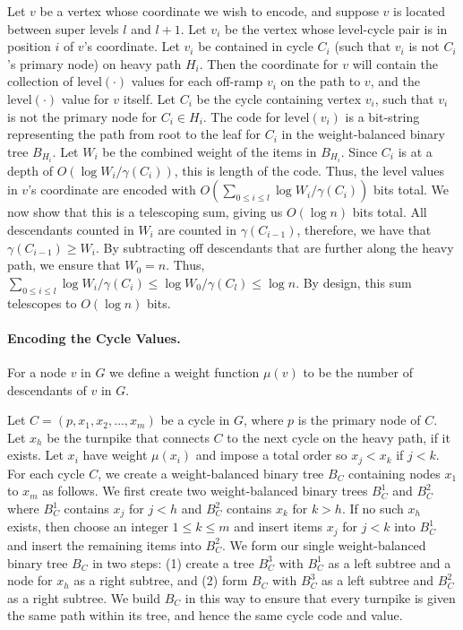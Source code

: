 \documentclass[11pt]{article}
\newcommand{\cycle}{\mathrm{cycle}}
\newcommand{\level}{\mathrm{level}}
\renewcommand{\subsection}[1]{\paragraph{#1.}}
\begin{document}
Let $v$ be a vertex whose coordinate we wish to encode, and suppose $v$ is located
between super levels $l$ and $l+1$. Let $v_i$ be the vertex whose $\level$-$\cycle$
pair is in position $i$ of $v$'s coordinate. Let $v_i$ be contained in cycle $C_i$ 
(such that $v_i$ is not $C_i$'s primary node) on heavy path $H_i$. 
\ifFull
Then the coordinate for $v$ will contain the collection of 
$\level(\cdot)$ values for each 
off-ramp $v_i$ on the path to $v$, and the $\level(\cdot)$ value for $v$
itself. Let $C_i$ be the cycle containing vertex $v_i$, such 
that $v_i$ is not the primary node for $C_i\in H_i$. \fi 
The code for $\level(v_i)$ is a bit-string representing the path 
from root to the leaf for $C_i$ in the weight-balanced binary tree 
$B_{H_i}$. Let $W_i$ be the combined weight of the items in $B_{H_i}$. 
Since $C_i$ is at a depth of $O(\log{W_i/\gamma(C_i)})$, this is 
length of the code.  
Thus, the level values in $v$'s coordinate are encoded with
$O(\sum_{0\leq i\leq l}\log{W_i/\gamma(C_i)})$ bits total. \ifFull
We now show that this is a telescoping sum, giving us $O(\log{n})$ bits total.
\ifFull
All descendants counted in $W_i$ are counted in $\gamma(C_{i-1})$, 
therefore, we have that $\gamma(C_{i-1}) \geq W_i$. By subtracting off  
descendants that are further along the heavy path, we ensure 
that $W_0 = n$. Thus, $\sum_{0\leq i\leq l} \log{W_i/\gamma(C_{i})} 
\leq \log{W_0/\gamma(C_l)} \leq \log{n}$. \else
By design, this sum telescopes to $O(\log{n})$ bits.
\fi

\subsection{Encoding the Cycle Values}
For a node $v$ in $G$ we define a weight function $\mu(v)$ to be the number
of descendants of $v$ in $G$.

Let $C=(p,x_1,x_2,\ldots,x_m)$ be a cycle in $G$, where $p$ is 
the primary node of $C$. Let $x_h$ be the turnpike that connects 
$C$ to the next cycle on the heavy path, if it exists. 
Let $x_i$ have weight $\mu(x_i)$ and impose a total order so 
$x_j<x_k$ if $j<k$. For each cycle $C$, we create a weight-balanced binary tree $B_C$ 
containing nodes $x_1$ to $x_m$ as follows. We first create 
two weight-balanced binary trees $B^1_C$ and $B^2_C$ 
where $B^1_C$ contains $x_j$ for $j < h$ and $B^2_C$ contains
 $x_k$ for $k > h$. If no such $x_h$ exists, then choose an 
integer $1\leq k\leq m$ and insert items $x_j$ for $j<k$ into 
$B^1_C$ and insert the remaining items into $B^2_C$. We form our single 
weight-balanced binary tree $B_C$ in two steps: (1) create a tree $B^3_C$ with 
$B^1_C$ as a left subtree and a node for $x_h$ as a right subtree, and (2)
form $B_C$ with $B^3_C$ as a left subtree and $B^2_C$ as a right subtree.
We build $B_C$ in this way to ensure that every turnpike is given the same
path within its tree, and hence the same cycle code and value.
\end{document}
